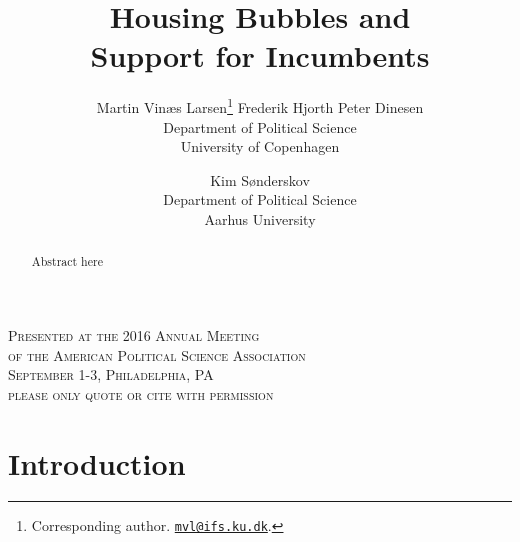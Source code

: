 \documentclass[12pt,a4paper]{article}
\title{\textbf{Housing Bubbles and \\Support for Incumbents}}
\author{Martin Vinæs Larsen\thanks{Corresponding author. \href{mailto:mvl@ifs.ku.dk}{\texttt{mvl@ifs.ku.dk}}. } \qquad Frederik Hjorth \qquad Peter  Dinesen \\Department of Political Science \\ University of Copenhagen \and Kim  Sønderskov  \\Department of Political Science \\ Aarhus University   }
\begin{document}
\maketitle

\begin{center}
	\textsc{Presented at the 2016 Annual Meeting  \\
	of the American Political Science Association \\
	September 1-3, Philadelphia, PA \\[1em]
	please only quote or cite with permission}
\end{center}

\begin{abstract} Abstract here
\noindent %
 
\end{abstract}



\newpage

\doublespacing

\section{Introduction}
\end{document}
